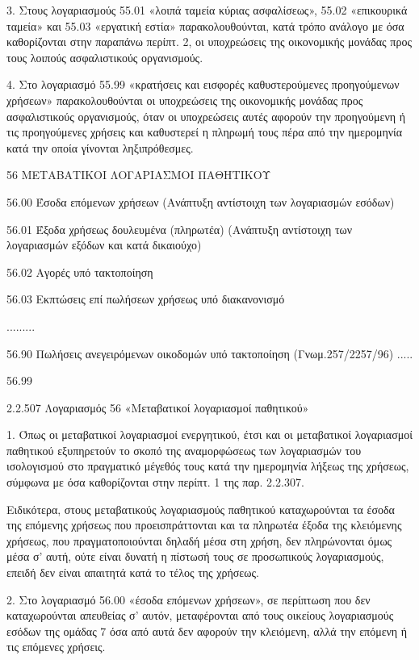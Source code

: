\documentclass[A4,10pt,greek]{book}
\begin{document}
3. Στους λογαριασμούς 55.01 «λοιπά ταμεία κύριας ασφαλίσεως», 55.02 «επικουρικά ταμεία» και 55.03 «εργατική εστία» παρακολουθούνται, κατά τρόπο ανάλογο με όσα καθορίζονται στην παραπάνω περίπτ. 2, οι υποχρεώσεις της οικονομικής μονάδας προς τους λοιπούς ασφαλιστικούς οργανισμούς.

4. Στο λογαριασμό 55.99 «κρατήσεις και εισφορές καθυστερούμενες προηγούμενων χρήσεων» παρακολουθούνται οι υποχρεώσεις της οικονομικής μονάδας προς ασφαλιστικούς οργανισμούς, όταν οι υποχρεώσεις αυτές αφορούν την προηγούμενη ή τις προηγούμενες χρήσεις και καθυστερεί η πληρωμή τους πέρα από την ημερομηνία κατά την οποία γίνονται ληξιπρόθεσμες.

 56   ΜΕΤΑΒΑΤΙΚΟΙ ΛΟΓΑΡΙΑΣΜΟΙ ΠΑΘΗΤΙΚΟΥ

        56.00   Έσοδα επόμενων χρήσεων
                    (Ανάπτυξη αντίστοιχη των λογαριασμών εσόδων)

        56.01   Έξοδα χρήσεως δουλευμένα (πληρωτέα)
                    (Ανάπτυξη αντίστοιχη των λογαριασμών εξόδων και κατά δικαιούχο)

        56.02   Αγορές υπό τακτοποίηση

        56.03   Εκπτώσεις επί πωλήσεων χρήσεως υπό διακανονισμό

        .........

        56.90   Πωλήσεις ανεγειρόμενων οικοδομών υπό τακτοποίηση
                    (Γνωμ.257/2257/96) .....

        56.99

2.2.507 Λογαριασμός 56 «Μεταβατικοί λογαριασμοί παθητικού»

1. Όπως οι μεταβατικοί λογαριασμοί ενεργητικού, έτσι και οι μεταβατικοί λογαριασμοί παθητικού εξυπηρετούν το σκοπό της αναμορφώσεως των λογαριασμών του ισολογισμού στο πραγματικό μέγεθός τους κατά την ημερομηνία λήξεως της χρήσεως, σύμφωνα με όσα καθορίζονται στην περίπτ. 1 της παρ. 2.2.307.

Ειδικότερα, στους μεταβατικούς λογαριασμούς παθητικού καταχωρούνται τα έσοδα της επόμενης χρήσεως που προεισπράττονται και τα πληρωτέα έξοδα της κλειόμενης χρήσεως, που πραγματοποιούνται δηλαδή μέσα στη χρήση, δεν πληρώνονται όμως μέσα σ' αυτή, ούτε είναι δυνατή η πίστωσή τους σε προσωπικούς λογαριασμούς, επειδή δεν είναι απαιτητά κατά το τέλος της χρήσεως.

2. Στο λογαριασμό 56.00 «έσοδα επόμενων χρήσεων», σε περίπτωση που δεν καταχωρούνται απευθείας σ' αυτόν, μεταφέρονται από τους οικείους λογαριασμούς εσόδων της ομάδας 7 όσα από αυτά δεν αφορούν την κλειόμενη, αλλά την επόμενη ή τις επόμενες χρήσεις.
\end{document}
